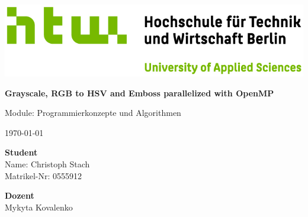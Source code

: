 


    \begin{titlepage}
        \noindent
        \includegraphics[width=1.0\textwidth]{images/Q04_HTW_Berlin_Logo_quer_pos_FARBIG_RGB.jpg}


        \vspace{2cm}

        \begin{center}
            \noindent
            \huge{\textbf{Grayscale, RGB to HSV and Emboss parallelized with OpenMP}}

            \vspace{1cm}

            \noindent
            \LARGE{Module: Programmierkonzepte und Algorithmen}

            \vspace{1cm}

            \noindent
            \small{\today}
        \end{center}

        \vfill

        \noindent
        \begin{minipage}[t]{0.5\textwidth}
            \begin{flushleft}
                \textbf{Student}\\
                Name: Christoph Stach\\
                Matrikel-Nr: 0555912                
            \end{flushleft}
        \end{minipage}
        \begin{minipage}[t]{0.5\textwidth}
            \begin{flushright}
                \textbf{Dozent}\\
                Mykyta Kovalenko\\
            \end{flushright}
        \end{minipage}
    \end{titlepage}

    \tableofcontents

    
    
    
    
    

    \begin{spacing}{1.0}
        \listoffigures        
    \end{spacing} 

    \begin{spacing}{1.0}
        \lstlistoflistings        
    \end{spacing}
